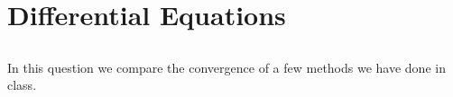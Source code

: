 \chapter{Differential Equations}

\section{}
In this question we compare the convergence of a few methods we have done in class.